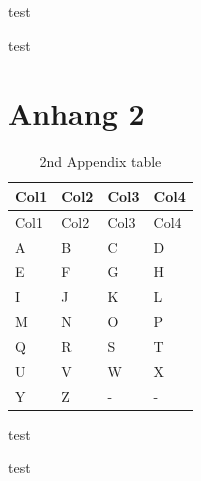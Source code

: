 \documentclass[
  11pt,
]{scrbook}
\begin{document}
\newpage{}

test

\newpage{}

test

\hypertarget{anhang-2}{%
\chapter{Anhang 2}\label{anhang-2}}

\setcounter{page}{1}

\hypertarget{tbl-letters2-full}{}
\begin{longtable}[]{@{}llll@{}}
\caption{\label{tbl-letters2-full}2nd Appendix table}\tabularnewline
\toprule\noalign{}
Col1 & Col2 & Col3 & Col4 \\
\midrule\noalign{}
\endfirsthead
\toprule\noalign{}
Col1 & Col2 & Col3 & Col4 \\
\midrule\noalign{}
\endhead
\bottomrule\noalign{}
\endlastfoot
A & B & C & D \\
E & F & G & H \\
I & J & K & L \\
M & N & O & P \\
Q & R & S & T \\
U & V & W & X \\
Y & Z & - & - \\
\end{longtable}

\newpage{}

test

\newpage{}

test


\backmatter
\end{document}
